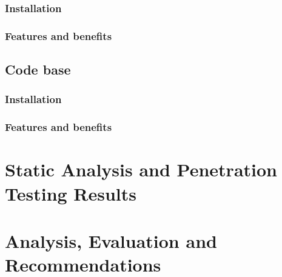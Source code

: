 \documentclass[11pt,english,a4paper]{report}
\begin{document}
\subsection{Installation}
\subsection{Features and benefits}
\section{Code base}
\subsection{Installation}
\subsection{Features and benefits}

\chapter{Static Analysis and Penetration Testing Results}
\chapter{Analysis, Evaluation and Recommendations}
\end{document}
